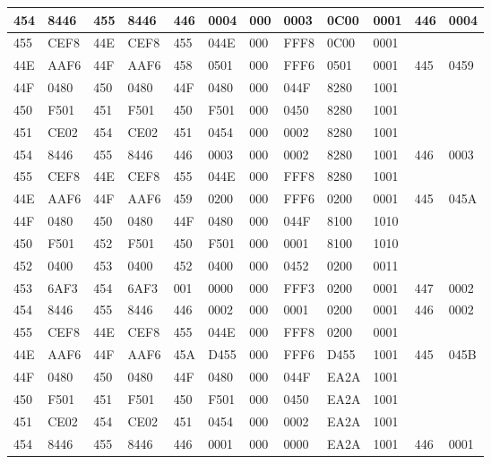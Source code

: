\begin{table}[!ht]
{\begin{tabular}{|l|l|l|l|l|l|l|l|l|l|l|l|}
        454 & 8446 & 455 & 8446 & 446 & 0004 & 000 & 0003 & 0C00 & 0001 & 446 & 0004 \\ \hline
        455 & CEF8 & 44E & CEF8 & 455 & 044E & 000 & FFF8 & 0C00 & 0001 & ~ & ~ \\ \hline
        44E & AAF6 & 44F & AAF6 & 458 & 0501 & 000 & FFF6 & 0501 & 0001 & 445 & 0459 \\ \hline
        44F & 0480 & 450 & 0480 & 44F & 0480 & 000 & 044F & 8280 & 1001 & ~ & ~ \\ \hline
        450 & F501 & 451 & F501 & 450 & F501 & 000 & 0450 & 8280 & 1001 & ~ & ~ \\ \hline
        451 & CE02 & 454 & CE02 & 451 & 0454 & 000 & 0002 & 8280 & 1001 & ~ & ~ \\ \hline
        454 & 8446 & 455 & 8446 & 446 & 0003 & 000 & 0002 & 8280 & 1001 & 446 & 0003 \\ \hline
        455 & CEF8 & 44E & CEF8 & 455 & 044E & 000 & FFF8 & 8280 & 1001 & ~ & ~ \\ \hline
        44E & AAF6 & 44F & AAF6 & 459 & 0200 & 000 & FFF6 & 0200 & 0001 & 445 & 045A \\ \hline
        44F & 0480 & 450 & 0480 & 44F & 0480 & 000 & 044F & 8100 & 1010 & ~ & ~ \\ \hline
        450 & F501 & 452 & F501 & 450 & F501 & 000 & 0001 & 8100 & 1010 & ~ & ~ \\ \hline
        452 & 0400 & 453 & 0400 & 452 & 0400 & 000 & 0452 & 0200 & 0011 & ~ & ~ \\ \hline
        453 & 6AF3 & 454 & 6AF3 & 001 & 0000 & 000 & FFF3 & 0200 & 0001 & 447 & 0002 \\ \hline
        454 & 8446 & 455 & 8446 & 446 & 0002 & 000 & 0001 & 0200 & 0001 & 446 & 0002 \\ \hline
        455 & CEF8 & 44E & CEF8 & 455 & 044E & 000 & FFF8 & 0200 & 0001 & ~ & ~ \\ \hline
        44E & AAF6 & 44F & AAF6 & 45A & D455 & 000 & FFF6 & D455 & 1001 & 445 & 045B \\ \hline
        44F & 0480 & 450 & 0480 & 44F & 0480 & 000 & 044F & EA2A & 1001 & ~ & ~ \\ \hline
        450 & F501 & 451 & F501 & 450 & F501 & 000 & 0450 & EA2A & 1001 & ~ & ~ \\ \hline
        451 & CE02 & 454 & CE02 & 451 & 0454 & 000 & 0002 & EA2A & 1001 & ~ & ~ \\ \hline
        454 & 8446 & 455 & 8446 & 446 & 0001 & 000 & 0000 & EA2A & 1001 & 446 & 0001 \\ \hline

\end{tabular}}
\end{table}
